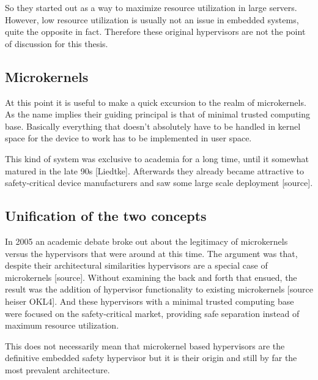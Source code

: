 So they started out as a way to maximize resource utilization in large servers. However, low resource utilization is usually not an issue in embedded systems, quite the opposite in fact. Therefore these original hypervisors are not the point of discussion for this thesis.
\subsection{Microkernels}
At this point it is useful to make a quick excursion to the realm of microkernels. As the name implies their guiding principal is that of minimal trusted computing base. Basically everything that doesn't absolutely have to be handled in kernel space for the device to work has to be implemented in user space.

This kind of system was exclusive to academia for a long time, until it somewhat matured in the late 90s [Liedtke]. Afterwards they already became attractive to safety-critical device manufacturers and saw some large scale deployment [source].

\subsection{Unification of the two concepts}
In 2005 an academic debate broke out about the legitimacy of microkernels versus the hypervisors that were around at this time. 
The argument was that, despite their architectural similarities hypervisors are a special case of microkernels  [source]. Without examining the back and forth that ensued, the result was the addition of hypervisor functionality to existing microkernels [source heiser OKL4]. And these hypervisors with a minimal trusted computing base were focused on the safety-critical market, providing safe separation instead of maximum resource utilization.

This does not necessarily mean that microkernel based hypervisors are the definitive embedded safety hypervisor but it is their origin and still by far the most prevalent architecture.


